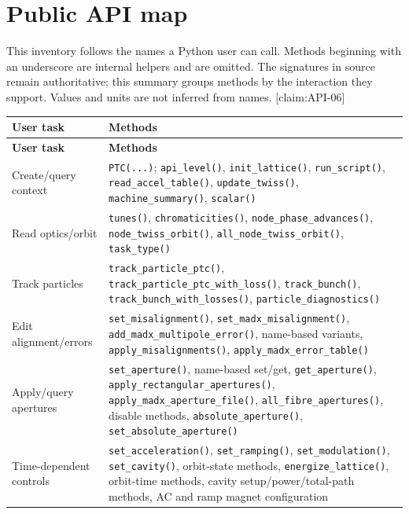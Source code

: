 \section{Public API map}
\label{sec:api-map}

This inventory follows the names a Python user can call. Methods beginning with an underscore are internal helpers and are omitted. The signatures in source remain authoritative; this summary groups methods by the interaction they support. Values and units are not inferred from names. [claim:API-06]

\begin{longtable}{L{0.31\textwidth}L{0.62\textwidth}}
\toprule
\textbf{User task} & \textbf{Methods} \\
\midrule
\endfirsthead
\toprule \textbf{User task} & \textbf{Methods} \\
\midrule
\endhead
Create/query context & \texttt{PTC(...)}; \texttt{api\_level()}, \texttt{init\_lattice()}, \texttt{run\_script()}, \texttt{read\_accel\_table()}, \texttt{update\_twiss()}, \texttt{machine\_summary()}, \texttt{scalar()} \\
Read optics/orbit & \texttt{tunes()}, \texttt{chromaticities()}, \texttt{node\_phase\_advances()}, \texttt{node\_twiss\_orbit()}, \texttt{all\_node\_twiss\_orbit()}, \texttt{task\_type()} \\
Track particles & \texttt{track\_particle\_ptc()}, \texttt{track\_particle\_ptc\_with\_loss()}, \texttt{track\_bunch()}, \texttt{track\_bunch\_with\_losses()}, \texttt{particle\_diagnostics()} \\
Edit alignment/errors & \texttt{set\_misalignment()}, \texttt{set\_madx\_misalignment()}, \texttt{add\_madx\_multipole\_error()}, name-based variants, \texttt{apply\_misalignments()}, \texttt{apply\_madx\_error\_table()} \\
Apply/query apertures & \texttt{set\_aperture()}, name-based set/get, \texttt{get\_aperture()}, \texttt{apply\_rectangular\_apertures()}, \texttt{apply\_madx\_aperture\_file()}, \texttt{all\_fibre\_apertures()}, disable methods, \texttt{absolute\_aperture()}, \texttt{set\_absolute\_aperture()} \\
Time-dependent controls & \texttt{set\_acceleration()}, \texttt{set\_ramping()}, \texttt{set\_modulation()}, \texttt{set\_cavity()}, orbit-state methods, \texttt{energize\_lattice()}, orbit-time methods, cavity setup/power/total-path methods, AC and ramp magnet configuration \\
\bottomrule
\end{longtable}


